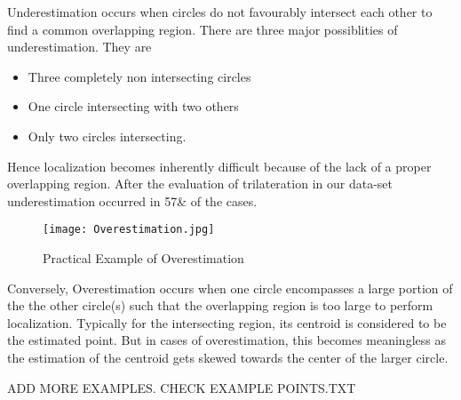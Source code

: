 \documentclass[twocolumn, 11pt]{IEEEtran}
\begin{document}
 
 
Underestimation occurs when circles do not favourably intersect each other to find a common overlapping region. There are three major possiblities of underestimation. They are
\begin{itemize}
    \item Three completely non intersecting circles
    \item One circle intersecting with two others
    \item Only two circles intersecting.
\end{itemize}
 Hence localization becomes inherently difficult because of the lack of a proper overlapping region. After the evaluation of trilateration in our data-set underestimation occurred in 57& of the cases.

\begin{figure}
    
\end{figure}


\begin{figure}[ht!]
\centering
\texttt{[image: Overestimation.jpg]}
\caption{ Practical Example of Overestimation\label{overflow}}
\end{figure}

Conversely, Overestimation occurs when one circle encompasses a large portion of the the other circle(s) such that the overlapping region is too large to perform localization. Typically for the intersecting region, its centroid is considered to be the estimated point. But in cases of overestimation, this becomes meaningless as the estimation of the centroid gets skewed towards the center of the larger circle. 

ADD MORE EXAMPLES. CHECK EXAMPLE POINTS.TXT
\end{document}
